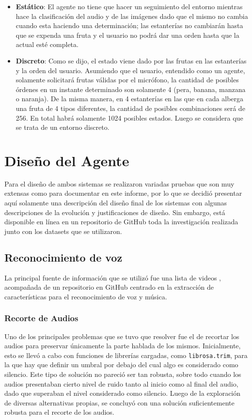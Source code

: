 \documentclass[a4paper, 12pt]{article}
\begin{document}
\begin{itemize}
\item \textbf{Estático}: El agente no tiene que hacer un seguimiento del entorno mientras hace la clasificación del audio y de las imágenes dado que el mismo no cambia cuando esta haciendo una determinación; las estanterías no cambiarán hasta que se expenda una fruta y el usuario no podrá dar una orden hasta que la actual esté completa.
\item \textbf{Discreto}: Como se dijo, el estado viene dado por las frutas en las estanterías y la orden del usuario. Asumiendo que el usuario, entendido como un agente, solamente solicitará frutas válidas por el micrófono, la cantidad de posibles órdenes en un instante determinado son solamente 4 (pera, banana, manzana o naranja). De la misma manera, en 4 estanterías en las que en cada alberga una fruta de 4 tipos diferentes, la cantidad de posibles combinaciones será de 256. En total habrá solamente 1024 posibles estados. Luego se considera que se trata de un entorno discreto.
\end{itemize}
\section{Diseño del Agente}
Para el diseño de ambos sistemas se realizaron variadas pruebas que son muy extensas como para documentar en este informe, por lo que se decidió presentar aquí solamente una descripción del diseño final de los sistemas con algunas descripciones de la evolución y justificaciones de diseño. Sin embargo, está disponible en línea en un repositorio de GitHub \cite{cita_repositorio_github} toda la investigación realizada junto con los datasets que se utilizaron.
\subsection{Reconocimiento de voz}
La principal fuente de información que se utilizó fue una lista de videos \cite{cita_videos}, acompañada de un repositorio en GitHub \cite{cita_repositorio} centrado en la extracción de características para el reconocimiento de voz y música.
\subsubsection{Recorte de Audios}
Uno de los principales problemas que se tuvo que resolver fue el de recortar los audios para preservar únicamente la parte hablada de los mismos. Inicialmente, esto se llevó a cabo con funciones de librerías cargadas, como \texttt{librosa.trim}, para la que hay que definir un umbral por debajo del cual algo es considerado como silencio. Este tipo de solución no pareció ser tan robusta, sobre todo cuando los audios presentaban cierto nivel de ruido tanto al inicio como al final del audio, dado que superaban el nivel considerado como silencio. Luego de la exploración de diversas alternativas propias, se concluyó con una solución suficientemente robusta para el recorte de los audios.
\end{document}
